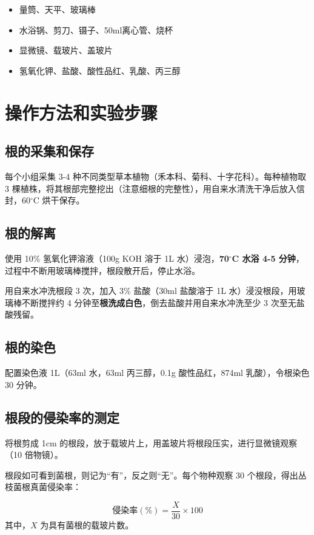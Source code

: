 \documentclass[10.5pt]{config}
\begin{document}
\begin{itemize}
    \item 量筒、天平、玻璃棒
    \item 水浴锅、剪刀、镊子、50ml离心管、烧杯
    \item 显微镜、载玻片、盖玻片
    \item 氢氧化钾、盐酸、酸性品红、乳酸、丙三醇
\end{itemize}

\section{操作方法和实验步骤}

\subsection{根的采集和保存}
每个小组采集 3-4 种不同类型草本植物（禾本科、菊科、十字花科）。每种植物取 3 棵植株，将其根部完整挖出（注意细根的完整性），用自来水清洗干净后放入信封，60$^{\circ}$C 烘干保存。

\subsection{根的解离}
使用 10\% 氢氧化钾溶液（100g KOH 溶于 1L 水）浸泡，\textbf{70$^{\circ}$C 水浴 4-5 分钟}，过程中不断用玻璃棒搅拌，根段散开后，停止水浴。

用自来水冲洗根段 3 次，加入 3\% 盐酸（30ml 盐酸溶于 1L 水）浸没根段，用玻璃棒不断搅拌约 4 分钟至\textbf{根洗成白色}，倒去盐酸并用自来水冲洗至少 3 次至无盐酸残留。

\subsection{根的染色}
配置染色液 1L（63ml 水，63ml 丙三醇，0.1g 酸性品红，874ml 乳酸），令根染色 30 分钟。

\subsection{根段的侵染率的测定}
将根剪成 1cm 的根段，放于载玻片上，用盖玻片将根段压实，进行显微镜观察（10 倍物镜）。

根段如可看到菌根，则记为“有”，反之则“无”。每个物种观察 30 个根段，得出丛枝菌根真菌侵染率：

\begin{equation}
    \text{侵染率}(\%) = \frac{X}{30} \times 100
    \label{eq:infection}
\end{equation}
其中，$X$ 为具有菌根的载玻片数。
\end{document}
